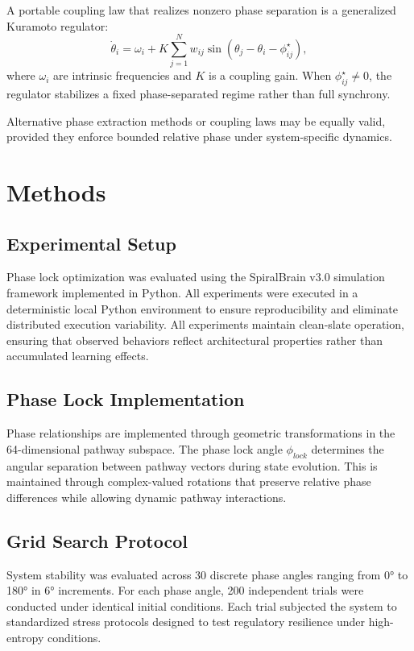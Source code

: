 \documentclass[12pt,a4paper]{article}
\begin{document}
A portable coupling law that realizes nonzero phase separation is a generalized Kuramoto regulator:
\[
\dot{\theta}_i = \omega_i + K\sum_{j=1}^N w_{ij}\sin(\theta_j-\theta_i-\phi^\star_{ij}),
\]
where $\omega_i$ are intrinsic frequencies and $K$ is a coupling gain. When $\phi^\star_{ij}\neq 0$,
the regulator stabilizes a fixed phase-separated regime rather than full synchrony.

Alternative phase extraction methods or coupling laws may be equally valid, provided they enforce bounded relative phase under system-specific dynamics.

\section{Methods}

\subsection{Experimental Setup}

Phase lock optimization was evaluated using the SpiralBrain v3.0 simulation framework implemented in Python. All experiments were executed in a deterministic local Python environment to ensure reproducibility and eliminate distributed execution variability. All experiments maintain clean-slate operation, ensuring that observed behaviors reflect architectural properties rather than accumulated learning effects.

\subsection{Phase Lock Implementation}

Phase relationships are implemented through geometric transformations in the 64-dimensional pathway subspace. The phase lock angle $\phi_{lock}$ determines the angular separation between pathway vectors during state evolution. This is maintained through complex-valued rotations that preserve relative phase differences while allowing dynamic pathway interactions.

\subsection{Grid Search Protocol}

System stability was evaluated across 30 discrete phase angles ranging from 0° to 180° in 6° increments. For each phase angle, 200 independent trials were conducted under identical initial conditions. Each trial subjected the system to standardized stress protocols designed to test regulatory resilience under high-entropy conditions.
\end{document}
